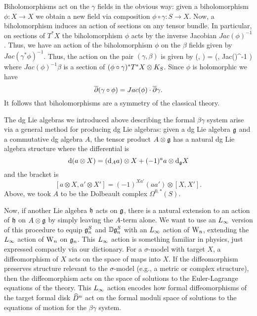 Biholomorphisms act on the $\gamma$ fields in the
obvious way: given a biholomorphism $\phi : X \to X$ we obtain a new
field via composition $\phi \circ \gamma : S \to
X$. Now, a biholomorphism induces an action of sections on any tensor
bundle. In particular, on sections of $T^*X$ the biholomorphism $\phi$
acts by the inverse Jacobian $Jac(\phi)^{-1}$. Thus, we have an action
of the biholomorphism $\phi$ on the $\beta$ fields given by
$Jac(\gamma^*\phi)^{-1}$. Thus, the action on the pair $(\gamma,
\beta)$ is given by
\ben
\phi \cdot (\gamma, \beta) = (\phi \circ \gamma, Jac(\phi)^{-1} \beta) 
\een
where $Jac(\phi)^{-1} \beta$ is a section of $(\phi \circ
\gamma)^*T^*X \otimes K_S$. Since $\phi$ is holomorphic we have $$\overline{\partial}
(\gamma \circ \phi) = Jac(\phi) \cdot \overline{\partial} \gamma .$$ It follows that biholomorphisms
are a symmetry of the classical theory. 

The dg Lie algebras we introduced above describing the formal
$\beta\gamma$ system arise via a general method for producing dg Lie algebras:
given a dg Lie algebra $\mathfrak g$ and a commutative dg algebra $A$, the tensor product $A \otimes \mathfrak g$ has a natural 
dg Lie algebra structure where the differential is
\[
{\rm d}( a \otimes X) = ({\rm d}_A a) \otimes X + (-1)^{a} a \otimes {\rm d}_\mathfrak g X
\]
and the bracket is
\[
[a \otimes X, a' \otimes X'] = (-1)^{Xa'} (aa') \otimes [X,X'].
\]
Above, we took $A$ to be the Dolbeault complex $\Omega^{0,*}(S)$.


Now, if another Lie algebra $\mathfrak h$ acts on $\mathfrak g$, there is a natural extension to an action of $\mathfrak h$ on $A \otimes \mathfrak g$ by simply leaving the $A$-term alone.
We want to use an $\L8$ version of this procedure to equip $\mathfrak g_n^S$ and $\mathbb D \mathfrak g_n^S$ with an $\L8$ action of ${{\rm W}_n}$,
extending the $\L8$ action of ${{\rm W}_n}$ on $\mathfrak g_n$.
This $\L8$ action is something familiar in physics, just expressed compactly via our dictionary.
For a $\sigma$-model with target $X$, a diffeomorphism of $X$ acts on the space of maps into $X$. 
If the diffeomorphism preserves structure relevant to the $\sigma$-model (e.g., a metric or complex structure), 
then the diffeomorphism acts on the space of solutions to the Euler-Lagrange equations of the theory.
This $\L8$ action encodes how formal diffeomorphisms of the target formal disk $\widehat{D}^n$ act on the formal moduli space of solutions to the equations of motion for the $\beta\gamma$ system. 

